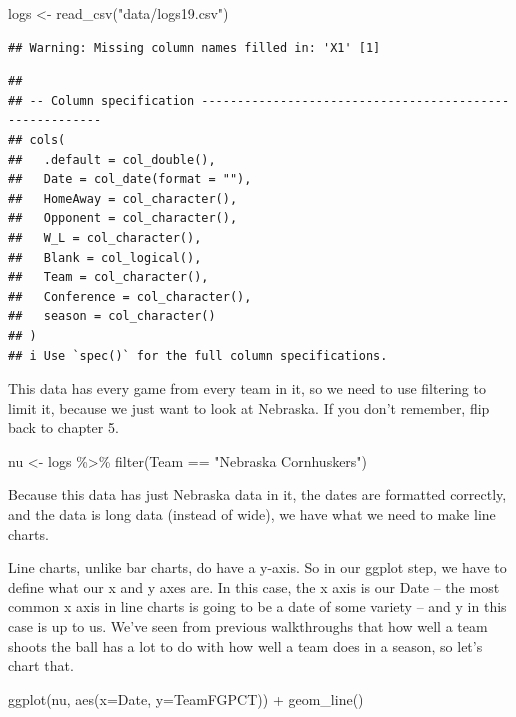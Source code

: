 \documentclass[
]{book}
\newenvironment{Shaded}{\begin{snugshade}}{\end{snugshade}}
\newcommand{\AttributeTok}[1]{\textcolor[rgb]{0.77,0.63,0.00}{#1}}
\newcommand{\FunctionTok}[1]{\textcolor[rgb]{0.00,0.00,0.00}{#1}}
\newcommand{\NormalTok}[1]{#1}
\newcommand{\OtherTok}[1]{\textcolor[rgb]{0.56,0.35,0.01}{#1}}
\newcommand{\SpecialCharTok}[1]{\textcolor[rgb]{0.00,0.00,0.00}{#1}}
\newcommand{\StringTok}[1]{\textcolor[rgb]{0.31,0.60,0.02}{#1}}
\begin{document}
\begin{Shaded}
\begin{Highlighting}[]
\NormalTok{logs }\OtherTok{\textless{}{-}} \FunctionTok{read\_csv}\NormalTok{(}\StringTok{"data/logs19.csv"}\NormalTok{)}
\end{Highlighting}
\end{Shaded}

\begin{verbatim}
## Warning: Missing column names filled in: 'X1' [1]
\end{verbatim}

\begin{verbatim}
## 
## -- Column specification --------------------------------------------------------
## cols(
##   .default = col_double(),
##   Date = col_date(format = ""),
##   HomeAway = col_character(),
##   Opponent = col_character(),
##   W_L = col_character(),
##   Blank = col_logical(),
##   Team = col_character(),
##   Conference = col_character(),
##   season = col_character()
## )
## i Use `spec()` for the full column specifications.
\end{verbatim}

This data has every game from every team in it, so we need to use filtering to limit it, because we just want to look at Nebraska. If you don't remember, flip back to chapter 5.

\begin{Shaded}
\begin{Highlighting}[]
\NormalTok{nu }\OtherTok{\textless{}{-}}\NormalTok{ logs }\SpecialCharTok{\%\textgreater{}\%} \FunctionTok{filter}\NormalTok{(Team }\SpecialCharTok{==} \StringTok{"Nebraska Cornhuskers"}\NormalTok{)}
\end{Highlighting}
\end{Shaded}

Because this data has just Nebraska data in it, the dates are formatted correctly, and the data is long data (instead of wide), we have what we need to make line charts.

Line charts, unlike bar charts, do have a y-axis. So in our ggplot step, we have to define what our x and y axes are. In this case, the x axis is our Date -- the most common x axis in line charts is going to be a date of some variety -- and y in this case is up to us. We've seen from previous walkthroughs that how well a team shoots the ball has a lot to do with how well a team does in a season, so let's chart that.

\begin{Shaded}
\begin{Highlighting}[]
\FunctionTok{ggplot}\NormalTok{(nu, }\FunctionTok{aes}\NormalTok{(}\AttributeTok{x=}\NormalTok{Date, }\AttributeTok{y=}\NormalTok{TeamFGPCT)) }\SpecialCharTok{+} \FunctionTok{geom\_line}\NormalTok{()}
\end{Highlighting}
\end{Shaded}
\end{document}
